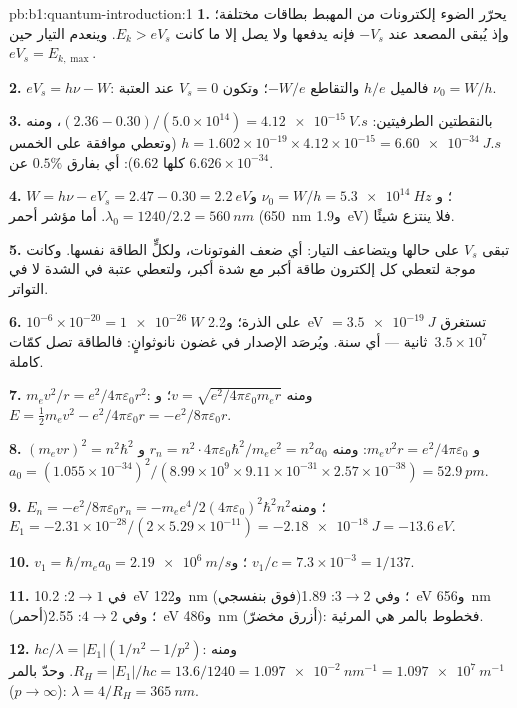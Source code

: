 \begin{solution}{pb:b1:quantum-introduction:1}
\textbf{1.} يحرّر الضوء إلكترونات من المهبط بطاقات
مختلفة؛ وإذ يُبقى المصعد عند $-V_s$ فإنه يدفعها ولا يصل إلا ما كانت
$E_k > eV_s$. وينعدم التيار حين $eV_s = E_{k,\max}$.

\textbf{2.} $eV_s = h\nu - W$: فالميل $h/e$ والتقاطع $-W/e$؛ وتكون $V_s = 0$ عند
العتبة $\nu_0 = W/h$.

\textbf{3.} بالنقطتين الطرفيتين: $(2.36 - 0.30)/(5.0 \times 10^{14}) = \qty{4.12e-15}{V.s}$،
ومنه $h = 1.602 \times 10^{-19} \times 4.12 \times 10^{-15} = \qty{6.60e-34}{J.s}$ (وتعطي موافقة على
الخمس كلها $6.62$): أي بفارق $0.5\%$ عن $6.626 \times 10^{-34}$.

\textbf{4.} $W = h\nu - eV_s = 2.47 - 0.30 = \qty{2.2}{eV}$؛ و $\nu_0 = W/h =
\qty{5.3e14}{Hz}$ و $\lambda_0 = 1240/2.2 = \qty{560}{nm}$. أما مؤشر أحمر
(\qty{650}{nm} و\qty{1.9}{eV}) فلا ينتزع شيئًا.

\textbf{5.} تبقى $V_s$ على حالها ويتضاعف التيار: أي ضعف الفوتونات، ولكلٍّ
الطاقة نفسها. وكانت موجة لتعطي كل إلكترون طاقة أكبر مع
شدة أكبر، ولتعطي عتبة في الشدة لا في التواتر.

\textbf{6.} $10^{-6} \times 10^{-20} = \qty{1e-26}{W}$ على الذرة؛ و\qty{2.2}{eV} $=
\qty{3.5e-19}{J}$ تستغرق $3.5 \times 10^7$~ثانية --- أي سنة. ويُرصَد الإصدار
في غضون نانوثوانٍ: فالطاقة تصل كمّات كاملة.

\textbf{7.} $m_ev^2/r = e^2/4\pi\varepsilon_0r^2$: ومنه $v = \sqrt{e^2/4\pi\varepsilon_0m_er}$؛ و $E =
\tfrac12m_ev^2 - e^2/4\pi\varepsilon_0r = -e^2/8\pi\varepsilon_0r$.

\textbf{8.} $(m_evr)^2 = n^2\hbar^2$ و $m_ev^2r = e^2/4\pi\varepsilon_0$: ومنه $r_n = n^2 \cdot
4\pi\varepsilon_0\hbar^2/m_ee^2 = n^2a_0$ و $a_0 = (1.055 \times 10^{-34})^2/(8.99 \times 10^9
\times 9.11 \times 10^{-31} \times 2.57 \times 10^{-38}) = \qty{52.9}{pm}$.

\textbf{9.} $E_n = -e^2/8\pi\varepsilon_0r_n = -m_ee^4/2(4\pi\varepsilon_0)^2\hbar^2n^2$؛ ومنه $E_1 =
-2.31 \times 10^{-28}/(2 \times 5.29 \times 10^{-11}) = \qty{-2.18e-18}{J} = \qty{-13.6}{eV}$.

\textbf{10.} $v_1 = \hbar/m_ea_0 = \qty{2.19e6}{m/s}$؛ و $v_1/c = 7.3 \times 10^{-3} =
1/137$.

\textbf{11.} في $2 \to 1$: \qty{10.2}{eV} و\qty{122}{nm} (فوق بنفسجي)؛ وفي $3 \to 2$:
\qty{1.89}{eV} و\qty{656}{nm} (أحمر)؛ وفي $4 \to 2$: \qty{2.55}{eV} و\qty{486}{nm}
(أزرق مخضرّ): فخطوط بالمر هي المرئية.

\textbf{12.} $hc/\lambda = |E_1|(1/n^2 - 1/p^2)$: ومنه $R_H = |E_1|/hc = 13.6/1240 =
\qty{1.097e-2}{nm^{-1}} = \qty{1.097e7}{m^{-1}}$. وحدّ بالمر ($p \to \infty$):
$\lambda = 4/R_H = \qty{365}{nm}$.


\end{solution}
